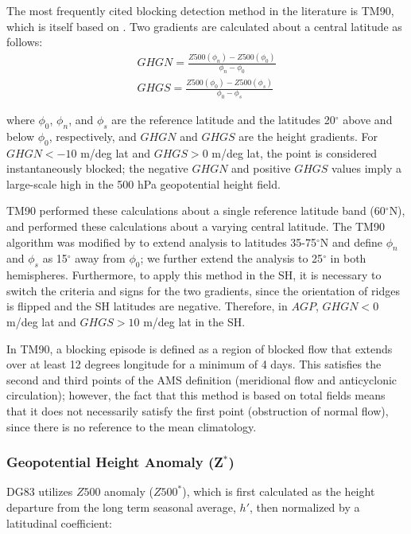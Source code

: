 \documentclass[smallextended]{svjour3}       %
\numberwithin{equation}{section}
\begin{document}
The most frequently cited blocking detection method in the literature is TM90, which is itself based on \cite{lejenas_characteristics_1983}. Two gradients are calculated about a central latitude as follows:
\begin{eqnarray}
GHGN=\frac{Z500(\phi_n)-Z500(\phi_0)}{\phi_n-\phi_0}\\
GHGS=\frac{Z500(\phi_0)-Z500(\phi_s)}{\phi_0-\phi_s}
\end{eqnarray}

\noindent
where $\phi_0$, $\phi_n$, and $\phi_s$ are the reference latitude and the latitudes 20$^\circ$ above and below $\phi_0$, respectively, and $GHGN$ and $GHGS$ are the height gradients. For $GHGN<-10$ m/deg lat and $GHGS>0$ m/deg lat, the point is considered instantaneously blocked; the negative $GHGN$ and positive $GHGS$ values imply a large-scale high in the 500 hPa geopotential height field.

TM90 performed these calculations about a single reference latitude band (60$^\circ$N){\color{blue}, and \cite{barnes_methodology_2012} performed these calculations about a varying central latitude.} The TM90 algorithm was modified by \cite{scherrer_two-dimensional_2006} to extend analysis to latitudes 35-75$^\circ$N and define $\phi_n$ and $\phi_s$ as 15$^\circ$ away from $\phi_0${\color{blue}; we further extend the analysis to 25$^\circ$ in both hemispheres.} Furthermore, to apply this method in the SH, it is necessary to switch the criteria and signs for the two gradients, since  the orientation of ridges is flipped and the SH latitudes are negative. Therefore, in $AGP$, $GHGN<0$ m/deg lat and $GHGS>10$ m/deg lat in the SH. 

In TM90, a blocking episode is defined as a region of blocked flow that extends over at least 12 degrees longitude for a minimum of 4 days. This satisfies the second and third points of the AMS definition (meridional flow and anticyclonic circulation); however, the fact that this method is based on total fields means that it does not necessarily satisfy the first point (obstruction of normal flow), since there is no reference to the mean climatology. 

\subsubsection{Geopotential Height Anomaly (Z$^\ast$)}\label{zanomdesc}

DG83 utilizes $Z500$ anomaly ($Z500^*$), which is first calculated as the height departure from the long term seasonal average, $h'$, then normalized by a latitudinal coefficient:
\end{document}
